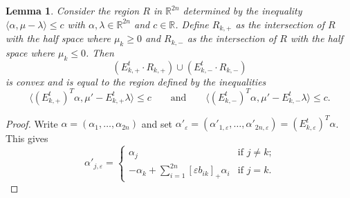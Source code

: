 \documentclass{amsart}
\newtheorem{lemma}[theorem]{Lemma}
\numberwithin{theorem}{section}
\newcommand{\RR}{\mathbb{R}}
\begin{document}
  \begin{lemma}
    Consider the region $R$ in $\RR^{2n}$ determined by the inequality $\langle\alpha,\mu-\lambda\rangle\le c$ with $\alpha,\lambda\in\RR^{2n}$ and $c\in\RR$.
    Define $R_{k,+}$ as the intersection of $R$ with the half space where $\mu_k\ge 0$ and $R_{k,-}$ as the intersection of $R$ with the half space where $\mu_k\le 0$.
    Then 
    \[(E_{k,+}^t\cdot R_{k,+}) \cup (E_{k,-}^t\cdot R_{k,-})\]
    is convex and is equal to the region defined by the inequalities 
    \[\langle (E_{k,+}^t)^T\alpha,\mu'-E_{k,+}^t\lambda\rangle\le c \qquad \text{and} \qquad \langle (E_{k,-}^t)^T\alpha,\mu'-E_{k,-}^t\lambda\rangle\le c.\]
  \end{lemma}
  \begin{proof}
    Write $\alpha=(\alpha_1,\ldots,\alpha_{2n})$ and set $\alpha'_\varepsilon=(\alpha'_{1,\varepsilon},\ldots,\alpha'_{2n,\varepsilon})=(E_{k,\varepsilon}^t)^T\alpha$.
    This gives 
    \[
      \alpha'_{j,\varepsilon}
      =
      \begin{cases}
        \alpha_j & \text{if $j\ne k$;}\\
        -\alpha_k+\sum\limits_{i=1}^{2n} [\varepsilon b_{ik}]_+ \alpha_i & \text{if $j=k$.}
      \end{cases}
    \]

  \end{proof}
\end{document}
